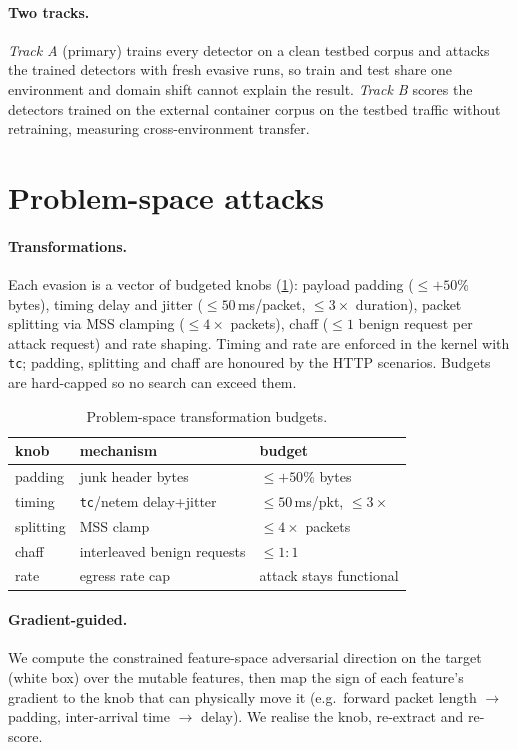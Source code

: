 \documentclass[letterpaper,twocolumn,10pt]{article}
\begin{document}
\paragraph{Two tracks.} \emph{Track A} (primary) trains every detector on a clean
testbed corpus and attacks the trained detectors with fresh evasive runs, so
train and test share one environment and domain shift cannot explain the result.
\emph{Track B} scores the detectors trained on the external container corpus on
the testbed traffic without retraining, measuring cross-environment transfer.

\section{Problem-space attacks}\label{sec:attack}
\paragraph{Transformations.} Each evasion is a vector of budgeted knobs
(\cref{tab:knobs}): payload padding ($\le{+}50\%$ bytes), timing delay and jitter
($\le 50$\,ms/packet, $\le 3\times$ duration), packet splitting via MSS clamping
($\le 4\times$ packets), chaff ($\le 1$ benign request per attack request) and
rate shaping. Timing and rate are enforced in the kernel with \texttt{tc};
padding, splitting and chaff are honoured by the HTTP scenarios. Budgets are
hard-capped so no search can exceed them.

\begin{table}[t]\centering\small
\begin{tabular}{lll}
\toprule
knob & mechanism & budget\\
\midrule
padding & junk header bytes & $\le{+}50\%$ bytes\\
timing & \texttt{tc}/netem delay+jitter & $\le 50$\,ms/pkt, $\le 3\times$\\
splitting & MSS clamp & $\le 4\times$ packets\\
chaff & interleaved benign requests & $\le 1{:}1$\\
rate & egress rate cap & attack stays functional\\
\bottomrule
\end{tabular}
\caption{Problem-space transformation budgets.}\label{tab:knobs}
\end{table}

\paragraph{Gradient-guided.} We compute the constrained feature-space adversarial
direction on the target (white box) over the mutable features, then map the sign
of each feature's gradient to the knob that can physically move it (e.g.\ forward
packet length $\to$ padding, inter-arrival time $\to$ delay). We realise the knob,
re-extract and re-score.
\end{document}
